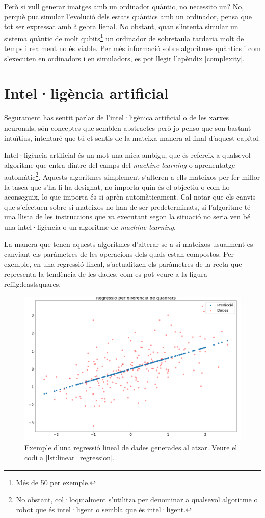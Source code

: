 Però si vull generar imatges amb un ordinador quàntic, no necessito un? No, perquè puc simular l'evolució dels estats quàntics amb un ordinador, pensa que tot ser expressat amb àlgebra lienal. No obstant, quan s'intenta simular un sistema quàntic de molt qubits\footnote{Més de 50 per exemple.} un ordinador de sobretaula tardaria molt de temps i realment no és viable. Per més informació sobre algoritmes quàntics i com s'executen en ordinadors i en simuladors, es pot llegir l'apèndix \ref{complexity}.  


\chapter{Intel·ligència artificial}

Segurament has sentit parlar de l'intel·ligènica artificial o de les xarxes neuronals, són conceptes que semblen abstractes però jo penso que son bastant intuïtius, intentaré que tú et sentis de la mateixa manera al final d'aquest capítol. 

Intel·ligència artificial és un mot una mica ambigu, que és refereix a qualsevol algoritme que entra dintre del camps del \textit{machine learning} o aprenentatge automàtic\footnote{No obstant, col·loquialment s'utilitza per denominar a qualsevol algoritme o robot que és intel·ligent o sembla que és intel·ligent. }. Aquests algoritmes simplement s'alteren a ells mateixos per fer millor la tasca que s'ha li ha designat, no importa quin és el objectiu o com ho aconseguix, lo que importa és si aprèn automàticament. Cal notar que els canvis que s'efectuen sobre si mateixos no han de ser predeterminats, si l'algoritme té una llista de les instruccions que va executant segon la situació no seria ven bé una intel·ligència o un algoritme de \textit{machine learning}. 

La manera que tenen aquests algoritmes d'alterar-se a si mateixos usualment es canviant els paràmetres de les operacions dels quals estan compostos. Per exemple, en una regressió lineal, s'actualitzen els paràmetres de la recta que representa la tendència de les dades, com es pot veure a la figura ref{fig:leastsquares}.

\begin{figure}
	\centering
	\includegraphics[width=0.7\linewidth]{Figures/least_squares}
	\caption{Exemple d'una regressió lineal de dades generades al atzar. Veure el codi a \ref{lst:linear_regression}.}
	\label{fig:leastsquares}
\end{figure}

